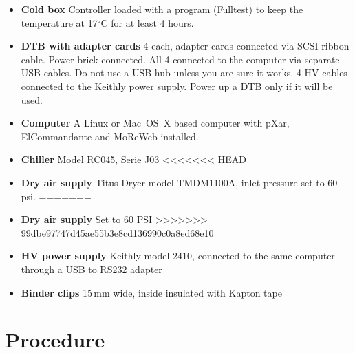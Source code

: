 \documentclass[12pt]{unlsilabsop}
\begin{document}
\begin{itemize}
\item \textbf{Cold box} Controller loaded with a program (Fulltest) to keep the temperature at 17$^\circ$C for at least 4 hours.
\item \textbf{DTB with adapter cards} 4 each, adapter cards connected via SCSI ribbon cable. Power brick connected. All 4 connected to the computer via separate USB cables. Do not use a USB hub unless you are sure it works. 4 HV cables connected to the Keithly power supply. Power up a DTB only if it will be used.
\item \textbf{Computer} A Linux or Mac~OS~X based computer with pXar, ElCommandante and MoReWeb installed.
\item \textbf{Chiller} Model RC045, Serie J03
<<<<<<< HEAD
\item \textbf{Dry air supply} Titus Dryer model TMDM1100A, inlet pressure set to 60\,psi.
=======
\item \textbf{Dry air supply} Set to 60 PSI
>>>>>>> 99dbe97747d45ae55b3e8cd136990c0a8ed68e10
\item \textbf{HV power supply} Keithly model 2410, connected to the same computer through a USB to RS232 adapter
\item \textbf{Binder clips} 15\,mm wide, inside insulated with Kapton tape
\end{itemize}

\section{Procedure}
\end{document}
